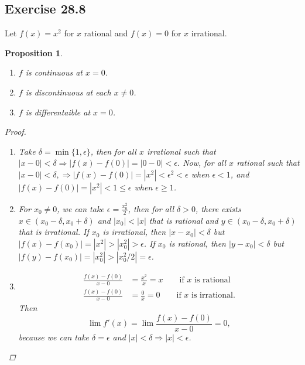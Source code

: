 \documentclass{article}
\newtheorem{proposition}[thm]{Proposition}
\renewcommand*{\implies}{\ensuremath{\Longrightarrow}}
\begin{document}
\subsection*{Exercise 28.8}
Let $f(x)=x^2$ for $x$ rational and $f(x)=0$ for $x$ irrational.
\begin{proposition}
    \begin{enumerate}[label=\textbf{(\alph*)}]\indent
        \item $f$ is continuous at $x=0$.
        \item $f$ is discontinuous at each $x\neq 0$.
        \item $f$ is differentaible at $x=0$.
    \end{enumerate}
    \begin{proof}\indent
        \begin{enumerate}[label=\textbf{(\alph*)}]
            \item Take $\delta = \min\{1, \epsilon\}$, then for all $x$ irrational such that
            $|x-0|<\delta \implies |f(x)-f(0)|=|0-0|<\epsilon$. Now, for all $x$ rational such that 
            $|x-0|<\delta, \implies |f(x)-f(0)|=|x^2| < \epsilon^2<\epsilon$ when $\epsilon <1$, and 
            $|f(x)-f(0)|=|x^2|<1\le \epsilon$ when $\epsilon \ge 1$.

            \item For $x_0\neq 0$, we can take $\epsilon = \frac{x_0^2}{2}$, then for all $\delta>0$,
            there exists $x\in (x_0-\delta, x_0+\delta)$ and $|x_0|<|x|$ that is rational and $y\in (x_0-\delta, x_0+\delta)$ that is
            irrational. If $x_0$ is irrational, then $|x-x_0|<\delta$ but $|f(x)-f(x_0)|=|x^2|>|x_0^2|>\epsilon$.
            If $x_0$ is rational, then $|y-x_0|<\delta$ but $|f(y)-f(x_0)|=|x_0^2|>|x_0^2/2|=\epsilon$.

            \item 
            \begin{align*}
                \frac{f(x)-f(0)}{x-0} & = \frac{x^2}{x} =x \qquad \text{if $x$ is rational} \\
                \frac{f(x)-f(0)}{x-0} & = \frac{0}{x} = 0 \qquad \text{if $x$ is irrational}.
            \end{align*}
            Then $$\lim f'(x) =\lim \frac{f(x)-f(0)}{x-0} = 0,$$
            because we can take $\delta = \epsilon$ and $|x|<\delta\implies |x|<\epsilon$.
        \end{enumerate}
    \end{proof}
\end{proposition}
\end{document}
